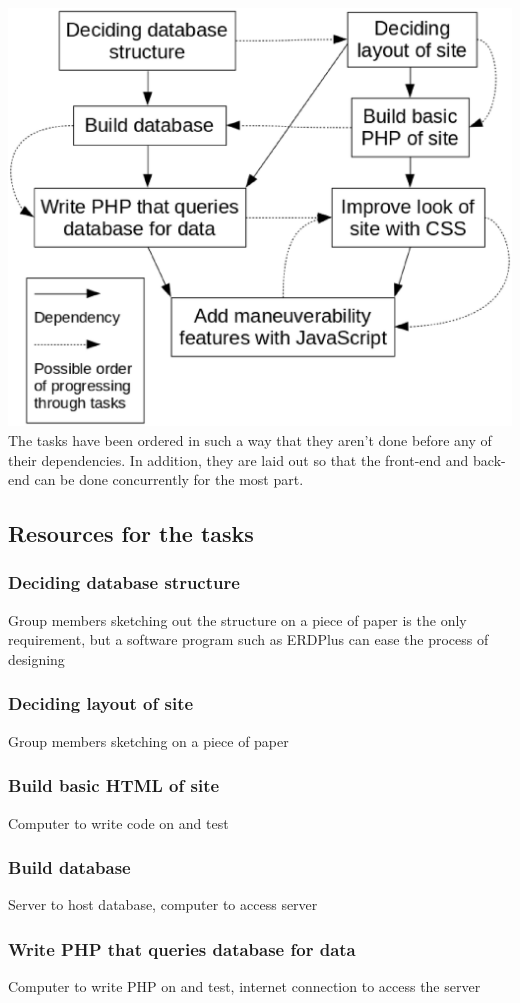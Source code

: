 \documentclass[12pt]{article}
\begin{document}
\includegraphics[width=\textwidth]{task_flowchart}
The tasks have been ordered in such a way that they aren't done before any of their
dependencies. In addition, they are laid out so that the front-end and back-end can be
done concurrently for the most part.
\subsection{Resources for the tasks}
\subsubsection{Deciding database structure}
Group members sketching out the structure on a piece of paper is the only requirement, but
a software program such as ERDPlus can ease the process of designing
\subsubsection{Deciding layout of site}
Group members sketching on a piece of paper
\subsubsection{Build basic HTML of site}
Computer to write code on and test
\subsubsection{Build database}
Server to host database, computer to access server
\subsubsection{Write PHP that queries database for data}
Computer to write PHP on and test, internet connection to access the server
\end{document}
